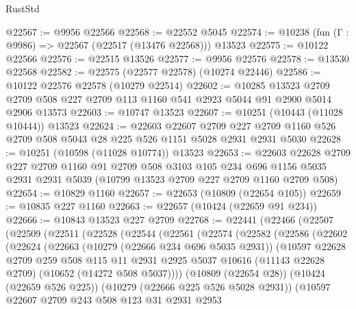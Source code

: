 \begin{lexlean}{RustStd}
\begin{coremodule}
@22567 := @9956 @22566
@22568 := @22552 @5045
@22574 := @10238 (fun (Γ : @9986) => @22567 (@22517 (@13476 @22568))) @13523
@22575 := @10122 @22566
@22576 := @22515 @13526
@22577 := @9956 @22576
@22578 := @13530 @22568
@22582 := @22575 (@22577 @22578) (@10274 @22446)
@22586 := @10122 @22576 @22578 (@10279 @22514)
@22602 := @10285
    @13523
    @2709
    @2709
    @508
    @227
    @2709
    @113
    @1160
    @541
    @2923
    @5044
    @91
    @2900
    @5014
    @2906
    @13573
@22603 := @10747 @13523
@22607 := @10251 (@10443 (@11028 @10444)) @13523
@22624 := @22603
    @22607
    @2709
    @227
    @2709
    @1160
    @526
    @2709
    @508
    @5043
    @28
    @225
    @526
    @1151
    @5028
    @2931
    @2931
    @5030
@22628 := @10251 (@10598 (@11028 @10774)) @13523
@22653 := @22603
    @22628
    @2709
    @227
    @2709
    @1160
    @91
    @2709
    @508
    @3103
    @105
    @234
    @696
    @1156
    @5035
    @2931
    @2931
    @5039
    (@10799 @13523 @2709 @227 @2709 @1160 @2709 @508)
@22654 := @10829 @1160
@22657 := @22653 (@10809 (@22654 @105))
@22659 := @10835 @227 @1160
@22663 := @22657 (@10424 (@22659 @91 @234))
@22666 := @10843 @13523 @227 @2709
@22768 := @22441
    (@22466
      (@22507
        (@22509
          (@22511
            (@22528
              (@22544
                (@22561
                  (@22574
                    (@22582
                      (@22586
                        (@22602
                          (@22624
                            (@22663
                              (@10279 (@22666 @234 @696 @5035 @2931))
                              (@10597
                                @22628
                                @2709
                                @259
                                @508
                                @115
                                @11
                                @2931
                                @2925
                                @5037
                                @10616
                                (@11143 @22628 @2709)
                                (@10652 (@14272 @508 @5037))))
                            (@10809 (@22654 @28))
                            (@10424 (@22659 @526 @225))
                            (@10279 (@22666 @225 @526 @5028 @2931))
                            (@10597
                              @22607
                              @2709
                              @243
                              @508
                              @123
                              @31
                              @2931
                              @2953

\end{coremodule}
\end{lexlean}

